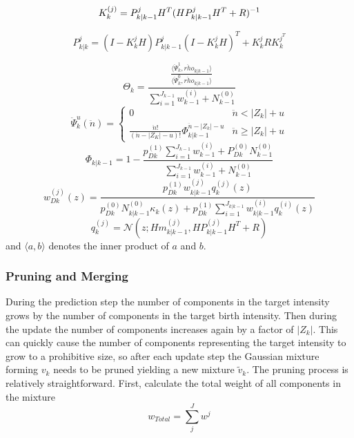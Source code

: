 \documentclass{article}
\begin{document}
\begin{equation}
  \label{eq:kalman_gain}
  K_k^{(j)} = P_{k|k-1}^jH^T(HP_{k|k-1}^jH^T + R)^{-1}\\
\end{equation}

\begin{equation}
  \label{eq:Pk}
  P_{k|k}^j = (I - K_k^jH)P_{k|k-1}^j(I - K_k^jH)^T + K_k^jRK_k^{j^T}
\end{equation}

\begin{equation}
  \label{eq:thetak}
  \Theta_k = \frac{\frac{\langle\ddot{\Psi}_k^1,\ddot{rho}_{k|k-1}\rangle}{\langle\ddot{\Psi}_k^0,\ddot{rho}_{k|k-1}\rangle}}{\sum_{i=1}^{J_{k-1}}w_{k-1}^{(i)} + N_{k-1}^{(0)}}
\end{equation}
\begin{equation}
  \label{eq:psi}
  \ddot{\Psi}_k^u(\ddot{n}) =
  \begin{cases}
    0 & \ddot{n} < |Z_k| + u \\
   \frac{\ddot{n}!}{(\ddot{n}-|Z_K|-u)!}\Phi_{k|k-1}^{\ddot{n} - |Z_k|-u} & \ddot{n} \ge |Z_k|+u
  \end{cases}
\end{equation}
\begin{equation}
  \label{eq:Phi}
  \Phi_{k|k-1} = 1 - \frac{p_{Dk}^{(1)}\sum_{i=1}^{J_{k-1}}w_{k-1}^{(i)} + P_{Dk}^{(0)}N_{k-1}^{(0)}}{\sum_{i=1}^{J_{k-1}}w_{k-1}^{(i)} + N_{k-1}^{(0)}}
\end{equation}
\begin{equation}
  \label{eq:wD}
  w_{Dk}^{(j)}(z) = \frac{p_{Dk}^{(1)}w_{k|k-1}^{(j)}q_k^{(j)}(z)}{p_{Dk}^{(0)}N_{k|k-1}^{(0)}\kappa_k(z) +  p_{Dk}^{(1)}\sum_{i=1}^{J_{k|k-1}}w_{k|k-1}^{(i)}q_k^{(i)}(z)  }
\end{equation}
\begin{equation}
  \label{eq:qz}
  q_k^{(j)} = \mathcal{N}(z;Hm_{k|k-1}^{(j)}, HP_{k|k-1}^{(j)}H^T + R)
\end{equation}
and $\langle a, b \rangle$ denotes the inner product of $a$ and $b$.

\subsubsection*{Pruning and Merging}
During the prediction step the number of components in the target intensity grows by the number of components in the target birth intensity. Then during the update the number of components increases again by a factor of $|Z_k|$. This can quickly cause the number of components representing the target intensity to grow to a prohibitive size, so after each update step the Gaussian mixture forming $v_{k}$ needs to be pruned yielding a new mixture $\tilde{v}_k$. The pruning process is relatively straightforward. First, calculate the total weight of all components in the mixture
\begin{equation}
  \label{eq:wtotal}
  w_{Total} = \sum_j^Jw^j
\end{equation}
\end{document}
